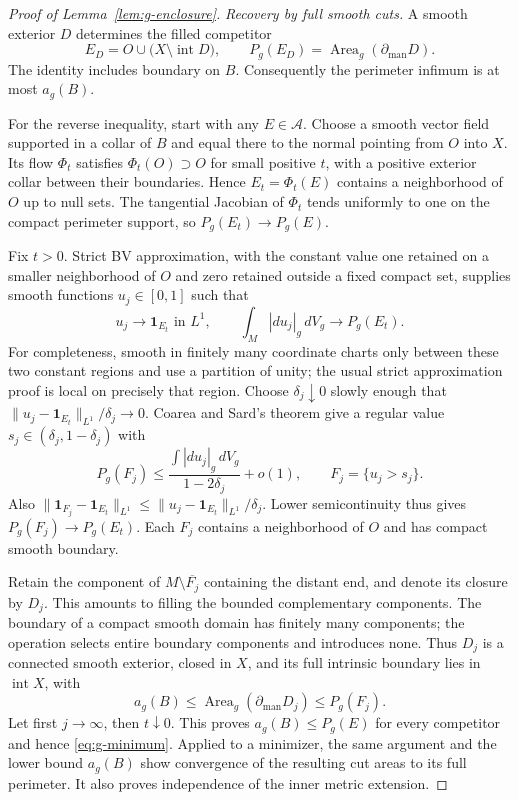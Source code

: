 \begin{proof}[Proof of Lemma~\ref{lem:g-enclosure}]
\emph{Recovery by full smooth cuts.}
A smooth exterior $D$ determines the filled competitor
\[
 E_D=O\cup\bigl(X\setminus\operatorname{int}D\bigr),
 \qquad
 P_g(E_D)=\operatorname{Area}_g(\partial_{\mathrm{man}}D).
\]
The identity includes boundary on $B$.  Consequently the perimeter
infimum is at most $a_g(B)$.

For the reverse inequality, start with any $E\in\mathcal A$.
Choose a smooth vector field supported in a collar of $B$ and equal
there to the normal pointing from $O$ into $X$.  Its flow $\Phi_t$
satisfies $\Phi_t(O)\supset O$ for small positive $t$, with a positive
exterior collar between their boundaries.  Hence
$E_t=\Phi_t(E)$ contains a neighborhood of $O$ up to null sets.
The tangential Jacobian of $\Phi_t$ tends uniformly to one on the
compact perimeter support, so $P_g(E_t)\to P_g(E)$.

Fix $t>0$.  Strict BV approximation, with the constant value one
retained on a smaller neighborhood of $O$ and zero retained outside
a fixed compact set, supplies smooth functions $u_j\in[0,1]$ such that
\[
 u_j\longrightarrow\mathbf1_{E_t}\text{ in }L^1,
 \qquad
 \int_M|du_j|_g\,dV_g\longrightarrow P_g(E_t).
\]
For completeness, smooth in finitely many coordinate charts only
between these two constant regions and use a partition of unity;
the usual strict approximation proof is local on precisely that
region.  Choose $\delta_j\downarrow0$ slowly enough that
$\|u_j-\mathbf1_{E_t}\|_{L^1}/\delta_j\to0$.  Coarea and Sard's
theorem give a regular value $s_j\in(\delta_j,1-\delta_j)$ with
\[
 P_g(F_j)\le
 \frac{\int|du_j|_g\,dV_g}{1-2\delta_j}+o(1),
 \qquad F_j=\{u_j>s_j\}.
\]
Also
$\|\mathbf1_{F_j}-\mathbf1_{E_t}\|_{L^1}
 \le\|u_j-\mathbf1_{E_t}\|_{L^1}/\delta_j$.
Lower semicontinuity thus gives $P_g(F_j)\to P_g(E_t)$.
Each $F_j$ contains a neighborhood of $O$ and has compact smooth
boundary.

Retain the component of $M\setminus\overline{F_j}$ containing the
distant end, and denote its closure by $D_j$.  This amounts to
filling the bounded complementary components.  The boundary of a
compact smooth domain has finitely many components; the operation
selects entire boundary components and introduces none.  Thus $D_j$
is a connected smooth exterior, closed in $X$, and its full intrinsic
boundary lies in $\operatorname{int}X$, with
\[
 a_g(B)\le\operatorname{Area}_g(\partial_{\mathrm{man}}D_j)
 \le P_g(F_j).
\]
Let first $j\to\infty$, then $t\downarrow0$.  This proves
$a_g(B)\le P_g(E)$ for every competitor and hence
\eqref{eq:g-minimum}.  Applied to a minimizer, the same argument and
the lower bound $a_g(B)$ show convergence of the resulting cut areas
to its full perimeter.  It also proves independence of the inner
metric extension.


\end{proof}
